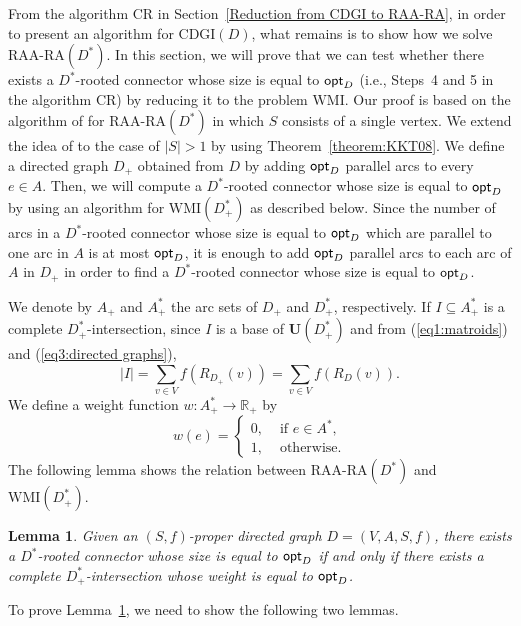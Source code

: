 \documentclass[11pt]{article}
\newcounter{ni}
\theoremstyle{plain}
\newtheorem{lemma}[theorem]{Lemma}\newtheorem{corollary}[theorem]{Corollary}\newtheorem{definition}[theorem]{Definition}\newtheorem{proposition}[theorem]{Proposition}\newtheorem{claim}[theorem]{Claim}\newtheorem{fact}[theorem]{Fact}\newtheorem{example}{Example}
\begin{document}
From the algorithm {\sf CR} in Section~\ref{Reduction from CDGI to RAA-RA},
in order 
to present an algorithm for $\mbox{CDGI}(D)$, what remains is to 
show how we solve $\mbox{RAA-RA}(D^{\ast})$. 
In this section, we will prove that we can test whether there exists 
a $D^{\ast}$-rooted connector whose size is equal to ${\sf opt}_D$ 
(i.e., Steps~4 and 5 in the algorithm {\sf CR}) 
by reducing it to the problem $\mbox{WMI}$. 
Our proof is based on the algorithm of \cite{F06} for 
$\mbox{RAA-RA}(D^{\ast})$ in which $S$ consists of a single vertex.
We extend the idea of \cite{F06} to the case of 
$|S|>1$ by using Theorem~\ref{theorem:KKT08}.  
We define a directed graph $D_+$ obtained from $D$ by adding ${\sf opt}_D$ parallel arcs to every 
$e \in A$. 
Then, we will compute a $D^{\ast}$-rooted connector whose size is equal to ${\sf opt}_D$ 
by using an algorithm for $\mbox{WMI}(D^{\ast}_+)$
as described below. 
Since the number of arcs in a $D^{\ast}$-rooted connector whose size is equal to ${\sf opt}_D$ 
which are parallel to one arc in $A$ 
is at most ${\sf opt}_D$, it is enough to add ${\sf opt}_D$ parallel arcs to 
each arc of $A$ in $D_+$ in order to find a $D^{\ast}$-rooted connector whose size 
is equal to ${\sf opt}_D$. 

We denote by $A_+$ and $A^{\ast}_+$ the arc sets of $D_+$ and $D^{\ast}_+$, respectively. 
If $I\subseteq A_+^{\ast}$ is a complete 
$D_+^{\ast}$-intersection, 
since $I$ is a base of $\bm{U}(D_+^{\ast})$ and 
from (\ref{eq1:matroids}) and (\ref{eq3:directed graphs}),  
\begin{equation} \label{eq1:proposition1:wmi}
|I| 
=\mbox{$\sum$}_{v \in V}f(R_{D_+}(v))
=\mbox{$\sum$}_{v \in V}f(R_D(v)). 
\end{equation}
We define a weight function $w \colon A_+^{\ast} \to \mathbb{R}_+$ by  
\begin{equation} \label{eq1:algorithm for raa-ra} 
w(e)= 
\left\{
\begin{array}{ll}
0, & \mbox{ if } e \in A^{\ast}, \\
1, & \mbox{ otherwise}. 
\end{array}
\right.
\end{equation}
The following lemma shows the relation between $\mbox{RAA-RA}(D^{\ast})$ and $\mbox{WMI}(D_+^{\ast})$. 
\begin{lemma} \label{lemma2:wmi}
Given an $(S,f)$-proper directed graph  $D=(V,A,S,f)$, 
there exists a $D^{\ast}$-rooted connector whose size is equal to ${\sf opt}_D$
if and only if 
there exists a complete $D_+^{\ast}$-intersection whose weight is equal to ${\sf opt}_D$.
\end{lemma}
To prove Lemma~\ref{lemma2:wmi}, we need to show the following two lemmas.
\end{document}
